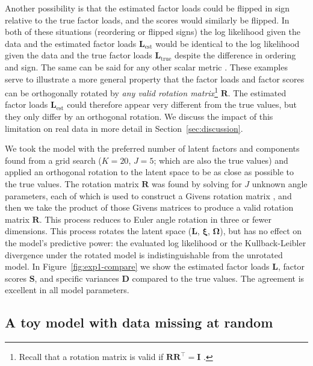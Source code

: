 \documentclass[twocolumn]{aastex62}
\newcommand{\vect}[1]{\boldsymbol{\mathbf{#1}}}
\renewcommand{\vec}[1]{\vect{#1}}
\newcommand{\transpose}{^\intercal}
\newcommand{\factorloads}{\textbf{L}}
\newcommand{\factorscores}{\textbf{S}}
\newcommand{\specificvariance}{\vec{D}}
\newcommand{\scoremeans}{\vec\xi}
\newcommand{\scorecovs}{\vec\Omega}
\newcommand{\NumLatentFactors}{J}
\newcommand{\NumComponents}{K}
\begin{document}
Another possibility is that the estimated factor loads could be flipped in sign 
relative to the true factor loads, and the scores would similarly be flipped. 
In both of these situations (reordering or flipped signs) the log likelihood 
given the data and the estimated factor loads $\factorloads_\textrm{est}$ 
would be identical to the log likelihood given the data and the true factor loads 
$\factorloads_\textrm{true}$
despite the difference in ordering and sign. The same can be said for any other
scalar metric \citep[e.g., Kullback-Leibler divergence;][]{Kullback:1951}.
These examples serve to illustrate a more 
general property that the factor loads and factor scores can be orthogonally 
rotated by \emph{any valid rotation matrix}\footnote{Recall that a rotation matrix is valid if 
$\vec{R}\vec{R}\transpose = \vec{I}\,\,$.} $\vec{R}$. The estimated factor loads 
$\factorloads_\textrm{est}$ could therefore appear very different from the true 
values, but they only differ by an orthogonal rotation. We discuss the impact of this limitation on real data in more detail in Section~\ref{sec:discussion}. 




We took the model with the preferred number of latent factors and components found
from a grid search ($\NumComponents = 20$, $\NumLatentFactors = 5$; which are also
the true values) and applied an orthogonal rotation to the latent space to be as
close as possible to the true values. The rotation matrix $\mathbf{R}$ was found
by solving for $\NumLatentFactors$ unknown angle parameters, each of which is used
to construct a Givens rotation matrix \citep{Givens:1958}, and then we take the product of those Givens
matrices to produce a valid rotation matrix $\vec{R}$. This process reduces to Euler angle rotation in three or fewer dimensions.
This process rotates the latent space
($\factorloads$, $\scoremeans$, $\scorecovs$), but has no effect on the model's 
predictive power: the evaluated log likelihood or the Kullback-Leibler divergence \citep{Kullback:1951} under the
rotated model is indistinguishable from the unrotated model.
In Figure~\ref{fig:exp1-compare} we show the estimated factor loads $\factorloads$,
factor scores $\factorscores$, and specific variances $\specificvariance$ compared
to the true values. The agreement is excellent in all model parameters.


 



\subsection{A toy model with data missing at random}
\label{sec:toy-model-missing-data}
\end{document}
